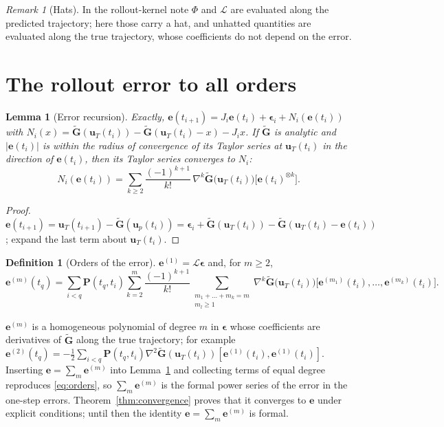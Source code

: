 \documentclass[11pt]{article}
\newtheorem{lemma}{Lemma}
\theoremstyle{definition}
\newtheorem{definition}{Definition}
\theoremstyle{remark}
\newtheorem{remark}{Remark}
\newcommand{\uu}{\mathbf{u}}
\newcommand{\ee}{\mathbf{e}}
\newcommand{\Gt}{\tilde{\mathbf{G}}}
\newcommand{\eps}{\bm{\epsilon}}
\newcommand{\LL}{\mathcal{L}}
\newcommand{\Pp}{\mathbf P}
\begin{document}
\begin{remark}[Hats]
In the rollout-kernel note $\Phi$ and $\LL$ are evaluated along the predicted trajectory; here those carry a hat, and unhatted quantities are evaluated along the true trajectory, whose coefficients do not depend on the error.
\end{remark}

\section{The rollout error to all orders}\label{sec:error}

\begin{lemma}[Error recursion]\label{lem:recursion}
Exactly, $\ee(t_{i+1})=J_i\ee(t_i)+\eps_i+N_i(\ee(t_i))$ with $N_i(x)=\Gt(\uu_T(t_i))-\Gt(\uu_T(t_i)-x)-J_ix$.
If $\Gt$ is analytic and $|\ee(t_i)|$ is within the radius of convergence of its Taylor series at $\uu_T(t_i)$ in the direction of $\ee(t_i)$, then its Taylor series converges to $N_i$:
\begin{equation}\label{eq:recursion}
N_i(\ee(t_i))=\sum_{k\ge2}\frac{(-1)^{k+1}}{k!}\,\nabla^k\Gt\big(\uu_T(t_i)\big)\big[\ee(t_i)^{\otimes k}\big].
\end{equation}
\end{lemma}

\begin{proof}
$\ee(t_{i+1})=\uu_T(t_{i+1})-\Gt(\uu_p(t_i))=\eps_i+\Gt(\uu_T(t_i))-\Gt(\uu_T(t_i)-\ee(t_i))$; expand the last term about $\uu_T(t_i)$.
\end{proof}

\begin{definition}[Orders of the error]\label{def:orders}
$\ee^{(1)}=\LL\eps$ and, for $m\ge2$,
\begin{equation}\label{eq:orders}
\ee^{(m)}(t_q)=\sum_{i<q}\Pp(t_q,t_i)\sum_{k=2}^{m}\frac{(-1)^{k+1}}{k!}\sum_{\substack{m_1+\dots+m_k=m\\ m_l\ge1}}\nabla^k\Gt\big(\uu_T(t_i)\big)\big[\ee^{(m_1)}(t_i),\dots,\ee^{(m_k)}(t_i)\big].
\end{equation}
\end{definition}

$\ee^{(m)}$ is a homogeneous polynomial of degree $m$ in $\eps$ whose coefficients are derivatives of $\Gt$ along the true trajectory; for example $\ee^{(2)}(t_q)=-\tfrac12\sum_{i<q}\Pp(t_q,t_i)\nabla^2\Gt(\uu_T(t_i))[\ee^{(1)}(t_i),\ee^{(1)}(t_i)]$.
Inserting $\ee=\sum_m\ee^{(m)}$ into Lemma~\ref{lem:recursion} and collecting terms of equal degree reproduces \eqref{eq:orders}, so $\sum_m\ee^{(m)}$ is the formal power series of the error in the one-step errors.
Theorem~\ref{thm:convergence} proves that it converges to $\ee$ under explicit conditions; until then the identity $\ee=\sum_m\ee^{(m)}$ is formal.
\end{document}
